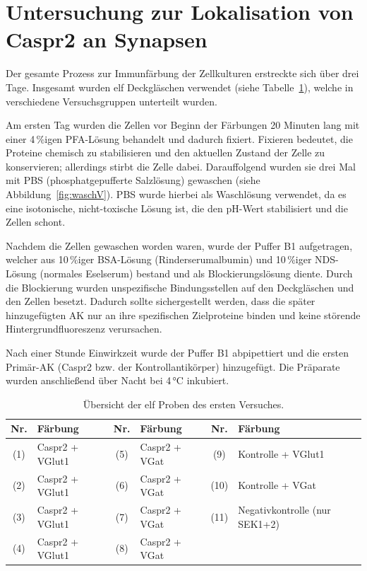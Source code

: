 \section{Untersuchung zur Lokalisation von Caspr2 an Synapsen}

Der gesamte Prozess zur Immunfärbung der Zellkulturen erstreckte sich über drei Tage.
Insgesamt wurden elf Deckgläschen verwendet (siehe Tabelle~\ref{tab:proben}), welche
in verschiedene Versuchsgruppen unterteilt wurden. 

Am ersten Tag wurden die Zellen vor Beginn der Färbungen 20 Minuten lang mit einer 4\,\%igen PFA-Lösung behandelt und dadurch fixiert. Fixieren bedeutet, die Proteine chemisch zu stabilisieren und den aktuellen Zustand der Zelle zu konservieren; allerdings stirbt die Zelle dabei. Darauffolgend wurden sie drei Mal mit PBS (phosphatgepufferte Salzlösung) gewaschen (siehe Abbildung~\ref{fig:waschV}). PBS wurde hierbei als Waschlösung verwendet, da es eine isotonische, nicht-toxische Lösung ist, die den pH-Wert stabilisiert und die Zellen schont.

Nachdem die Zellen gewaschen worden waren, wurde der Puffer B1
aufgetragen, welcher aus 10\,\%iger BSA-Lösung (Rinderserumalbumin) und
10\,\%iger NDS-Lösung (normales Eselserum) bestand und als
Blockierungslösung diente. Durch die Blockierung wurden unspezifische Bindungsstellen auf den Deckgläschen und den Zellen besetzt. Dadurch sollte sichergestellt werden, dass die später hinzugefügten AK nur an ihre spezifischen Zielproteine binden und keine störende Hintergrundfluoreszenz verursachen.

Nach einer Stunde Einwirkzeit wurde der Puffer B1 abpipettiert und die
ersten Primär-AK (Caspr2 bzw. der Kontrollantikörper)
hinzugefügt. Die Präparate wurden anschließend über Nacht bei 4\,°C
inkubiert.

\clearpage
\begin{table}[htbp]
	\centering
	\caption{Übersicht der elf Proben des ersten Versuches.}
	\label{tab:proben}
	\setlength{\tabcolsep}{3pt}
	\begin{tabularx}{\textwidth}{c X c X c X}
		\toprule
		\textbf{Nr.} & \textbf{Färbung} &
		\textbf{Nr.} & \textbf{Färbung} &
		\textbf{Nr.} & \textbf{Färbung} \\
		\midrule
		(1) & Caspr2 + VGlut1 &
		(5) & Caspr2 + VGat &
		(9) & Kontrolle + VGlut1 \\
		(2) & Caspr2 + VGlut1 &
		(6) & Caspr2 + VGat &
		(10) & Kontrolle + VGat \\
		(3) & Caspr2 + VGlut1 &
		(7) & Caspr2 + VGat &
		(11) & Negativkontrolle (nur SEK1+2) \\
		(4) & Caspr2 + VGlut1 &
		(8) & Caspr2 + VGat &
		& \\
		\bottomrule
	\end{tabularx}
\end{table}

